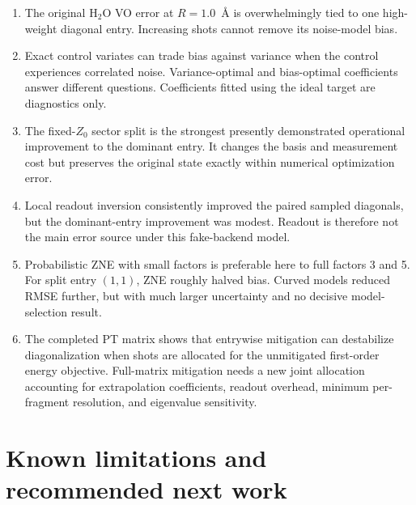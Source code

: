 \documentclass[11pt]{article}
\begin{document}
\begin{enumerate}
  \item The original H$_2$O VO error at $R=1.0$~\AA{} is overwhelmingly tied
        to one high-weight diagonal entry.  Increasing shots cannot remove
        its noise-model bias.
  \item Exact control variates can trade bias against variance when the
        control experiences correlated noise.  Variance-optimal and
        bias-optimal coefficients answer different questions.  Coefficients
        fitted using the ideal target are diagnostics only.
  \item The fixed-$Z_0$ sector split is the strongest presently demonstrated
        operational improvement to the dominant entry.  It changes the basis
        and measurement cost but preserves the original state exactly within
        numerical optimization error.
  \item Local readout inversion consistently improved the paired sampled
        diagonals, but the dominant-entry improvement was modest.  Readout is
        therefore not the main error source under this fake-backend model.
  \item Probabilistic ZNE with small factors is preferable here to full
        factors 3 and 5.  For split entry $(1,1)$, ZNE roughly halved bias.
        Curved models reduced RMSE further, but with much larger uncertainty
        and no decisive model-selection result.
  \item The completed PT matrix shows that entrywise mitigation can destabilize
        diagonalization when shots are allocated for the unmitigated
        first-order energy objective.  Full-matrix mitigation needs a new
        joint allocation accounting for extrapolation coefficients, readout
        overhead, minimum per-fragment resolution, and eigenvalue sensitivity.
\end{enumerate}

\section{Known limitations and recommended next work}
\end{document}
